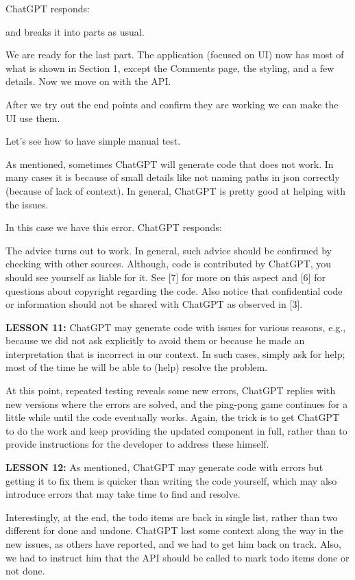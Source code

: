 \documentclass[runningheads]{llncs}
\begin{document}
ChatGPT responds:

and breaks it into parts as usual.
  
We are ready for the last part. The application (focused on UI) now has most of what is shown in Section 1, except the Comments page, the
styling, and a few details. Now we move on with the API.
    
After we try out the end points and confirm they are working we can make the UI use them.

Let's see how to have simple manual test.
  
As mentioned, sometimes ChatGPT will generate code that does not work. In many cases it is because of small details like not naming paths in json correctly (because of lack of context). In general, ChatGPT is pretty good at helping with the issues.

In this case we have this error. ChatGPT responds:

The advice turns out to work. In general, such advice should be confirmed by checking with other sources. Although, code is contributed by ChatGPT, you should see yourself as liable for it. See [7] for more on this aspect and [6] for questions about copyright regarding the code. Also notice that confidential code or information should not be shared with ChatGPT as observed in [3].
  
\textbf{LESSON 11:} ChatGPT may generate code with issues for various reasons, e.g., because we did not ask explicitly to avoid them or because he made an interpretation that is incorrect in our context. In such cases, simply ask for help; most of the time he will be able to (help) resolve the problem.

At this point, repeated testing reveals some new errors, ChatGPT replies with new versions where the errors are solved, and the ping-pong game continues for a little while until the code eventually works. Again, the trick is to get ChatGPT to do the work and keep providing the updated component in full, rather than to provide instructions for the developer to address these himself.

\textbf{LESSON 12:} As mentioned, ChatGPT may generate code with errors but getting it to fix them is quicker than writing the code yourself, which may also introduce errors that may take time to find and resolve.

Interestingly, at the end, the todo items are back in single list, rather than two different for done and undone. ChatGPT lost some context along the way in the new issues, as others have reported, and we had to get him back on track. Also, we had to instruct him that the API should be called to mark todo items done or not done.
\end{document}
